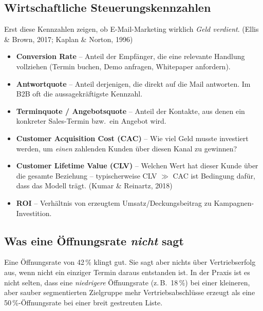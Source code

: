 \documentclass[11pt,a4paper,oneside]{article}
\newcommand{\fachbegriff}[1]{\textbf{#1}}
\newcommand{\quelle}[1]{{\footnotesize\color{lpGray}(#1)}}
\begin{document}
\subsection{Wirtschaftliche Steuerungskennzahlen}

Erst diese Kennzahlen zeigen, ob E-Mail-Marketing wirklich \emph{Geld verdient}. \quelle{Ellis \& Brown, 2017; Kaplan \& Norton, 1996}

\begin{itemize}
  \item \fachbegriff{Conversion Rate} -- Anteil der Empfänger, die eine relevante Handlung vollziehen (Termin buchen, Demo anfragen, Whitepaper anfordern).
  \item \fachbegriff{Antwortquote} -- Anteil derjenigen, die direkt auf die Mail antworten. Im B2B oft die aussagekräftigste Kennzahl.
  \item \fachbegriff{Terminquote / Angebotsquote} -- Anteil der Kontakte, aus denen ein konkreter Sales-Termin bzw.\ ein Angebot wird.
  \item \fachbegriff{Customer Acquisition Cost (CAC)} -- Wie viel Geld musste investiert werden, um \emph{einen} zahlenden Kunden über diesen Kanal zu gewinnen?
  \item \fachbegriff{Customer Lifetime Value (CLV)} -- Welchen Wert hat dieser Kunde über die gesamte Beziehung -- typischerweise CLV $\gg$ CAC ist Bedingung dafür, dass das Modell trägt. \quelle{Kumar \& Reinartz, 2018}
  \item \fachbegriff{ROI} -- Verhältnis von erzeugtem Umsatz/Deckungsbeitrag zu Kampagnen-Investition.
\end{itemize}

\subsection{Was eine Öffnungsrate \emph{nicht} sagt}

Eine Öffnungsrate von 42\,\% klingt gut. Sie sagt aber nichts über Vertriebserfolg aus, wenn nicht ein einziger Termin daraus entstanden ist. In der Praxis ist es nicht selten, dass eine \emph{niedrigere} Öffnungsrate (z.\,B.\ 18\,\%) bei einer kleineren, aber sauber segmentierten Zielgruppe mehr Vertriebsabschlüsse erzeugt als eine 50\,\%-Öffnungsrate bei einer breit gestreuten Liste.
\end{document}
